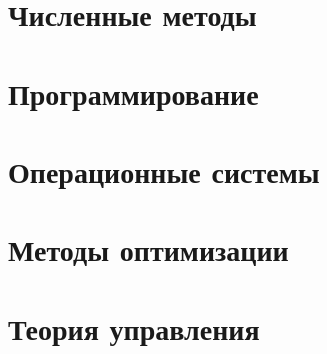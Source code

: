 \documentclass[12pt,a4paper]{article}
\begin{document}
\section{Численные методы}


\section{Программирование}


\section{Операционные системы}


\section{Методы оптимизации}


\section{Теория управления}

\end{document}
